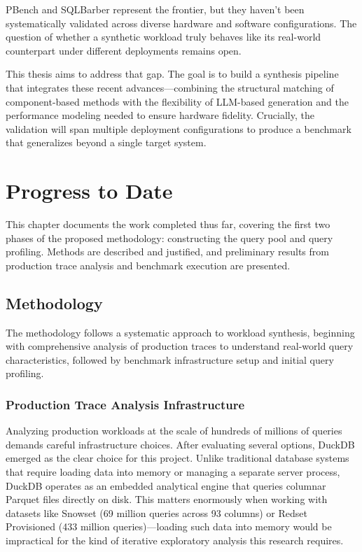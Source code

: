 \documentclass[12pt]{report}
\begin{document}
PBench and SQLBarber represent the frontier, but they haven't been systematically validated across diverse hardware and software configurations. The question of whether a synthetic workload truly behaves like its real-world counterpart under different deployments remains open.

This thesis aims to address that gap. The goal is to build a synthesis pipeline that integrates these recent advances---combining the structural matching of component-based methods with the flexibility of LLM-based generation and the performance modeling needed to ensure hardware fidelity. Crucially, the validation will span multiple deployment configurations to produce a benchmark that generalizes beyond a single target system.

\chapter{Progress to Date}
\label{ch:progress}

This chapter documents the work completed thus far, covering the first two phases of the proposed methodology: constructing the query pool and query profiling. Methods are described and justified, and preliminary results from production trace analysis and benchmark execution are presented.

\section{Methodology}
\label{sec:methodology}

The methodology follows a systematic approach to workload synthesis, beginning with comprehensive analysis of production traces to understand real-world query characteristics, followed by benchmark infrastructure setup and initial query profiling.

\subsection{Production Trace Analysis Infrastructure}
\label{subsec:trace-infrastructure}

Analyzing production workloads at the scale of hundreds of millions of queries demands careful infrastructure choices. After evaluating several options, DuckDB emerged as the clear choice for this project. Unlike traditional database systems that require loading data into memory or managing a separate server process, DuckDB operates as an embedded analytical engine that queries columnar Parquet files directly on disk. This matters enormously when working with datasets like Snowset (69 million queries across 93 columns) or Redset Provisioned (433 million queries)---loading such data into memory would be impractical for the kind of iterative exploratory analysis this research requires.
\end{document}
